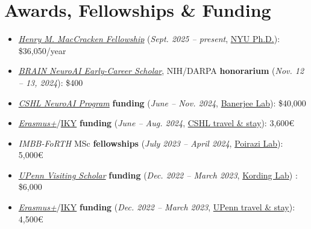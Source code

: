 \documentclass[letterpaper,11pt]{article}
\begin{document}
\section{Awards, Fellowships \& Funding}
\begin{itemize}
    \setlength\itemsep{-0.3em}
      \item \textit{\href{https://gsas.nyu.edu/admissions/financial-aid/graduate-school-fellowships-and-assistantships.html}{Henry M. MacCracken Fellowship}} (\textit{Sept. 2025 -- present}, \hyperref[NYUPhDMarker]{NYU Ph.D.}): \$36,050/year
      \item \textit{\hyperref[BrainNeuroAIWorkshop2024PosterMarker]{BRAIN NeuroAI Early-Career Scholar}}, NIH/DARPA \textbf{honorarium} (\textit{Nov. 12 -- 13, 2024}): \$400
      \item \textit{\href{https://www.cshl.edu/research/neuroscience/neuroai/}{CSHL NeuroAI Program}} \textbf{funding} (\textit{June -- Nov. 2024}, \hyperref[BanerjeeLabMarker]{Banerjee Lab})\label{CSHLNeuroAIResearchInternFundingMarker}: \$40,000
      \item \textit{\href{https://erasmus-plus.ec.europa.eu/opportunities/opportunities-for-individuals/students/traineeships-abroad-for-students}{Erasmus+}}/\href{https://www.iky.gr/en/discover-erasmus}{IKY} \textbf{funding} (\textit{June -- Aug. 2024}, \hyperref[BanerjeeLabMarker]{CSHL travel \& stay}): 3,600\euro
      \item \textit{IMBB-FoRTH} MSc \textbf{fellowships} (\textit{July 2023 -- April 2024}, \hyperref[PoiraziLabMarker]{Poirazi Lab})\label{IMBBFoRTHFellowshipMarker}: 5,000\euro
        \item \textit{\href{https://global.upenn.edu/isss/j1scholar}{UPenn Visiting Scholar}} \textbf{funding} (\textit{Dec. 2022 -- March 2023}, \hyperref[KordingLabMarker]{Kording Lab}) \label{UPennVisitingScholarFundingMarker}: \$6,000
        \item \textit{\href{https://erasmus-plus.ec.europa.eu/opportunities/opportunities-for-individuals/students/traineeships-abroad-for-students}{Erasmus+}}/\href{https://www.iky.gr/en/discover-erasmus}{IKY} \textbf{funding} (\textit{Dec. 2022 -- March 2023}, \hyperref[KordingLabMarker]{UPenn travel \& stay}): 4,500\euro
\end{itemize}

\end{document}
